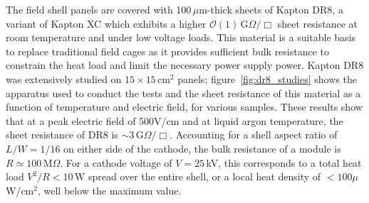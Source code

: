The field shell panels are covered with 100\,$\mu$m-thick sheets of Kapton DR8, a variant of Kapton XC which exhibits a higher $\mathcal{O}(1)\,$G$\Omega/\Box$ sheet resistance at room temperature and under low voltage loads. This material is a suitable basis to replace traditional field cages as it provides sufficient bulk resistance to constrain the heat load and limit the necessary power supply power. Kapton DR8 was extensively studied on $15\times15$\,cm$^2$ panels; figure~\ref{fig:dr8_studies} shows the apparatus used to conduct the tests and the sheet resistance of this material as a function of temperature and electric field, for various samples. These results show that at a peak electric field of 500V/cm and at liquid argon temperature, the sheet resistance of DR8 is $\sim3\,$G$\Omega/\Box$. Accounting for a shell aspect ratio of $L/W=1/16$ on either side of the cathode, the bulk resistance of a module is $R\simeq100$\,M$\Omega$. For a cathode voltage of $V=25$\,kV, this corresponds to a total heat load $V^2/R<10$\,W spread over the entire shell, or a local heat density of $<100\mu$W/cm$^2$, well below the maximum value.

